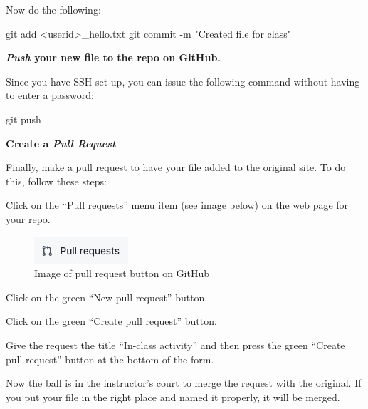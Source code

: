 \documentclass[
  letterpaper,
  DIV=11,
  numbers=noendperiod]{scrreport}
\newenvironment{Shaded}{\begin{snugshade}}{\end{snugshade}}
\newcommand{\AttributeTok}[1]{\textcolor[rgb]{0.40,0.45,0.13}{#1}}
\newcommand{\FunctionTok}[1]{\textcolor[rgb]{0.28,0.35,0.67}{#1}}
\newcommand{\NormalTok}[1]{\textcolor[rgb]{0.00,0.23,0.31}{#1}}
\newcommand{\OperatorTok}[1]{\textcolor[rgb]{0.37,0.37,0.37}{#1}}
\newcommand{\StringTok}[1]{\textcolor[rgb]{0.13,0.47,0.30}{#1}}
\begin{document}
Now do the following:

\begin{Shaded}
\begin{Highlighting}[]
\FunctionTok{git}\NormalTok{ add }\OperatorTok{\textless{}}\NormalTok{userid}\OperatorTok{\textgreater{}}\NormalTok{\_hello.txt}
\FunctionTok{git}\NormalTok{ commit }\AttributeTok{{-}m} \StringTok{"Created file for class"}
\end{Highlighting}
\end{Shaded}

\textbf{\emph{Push} your new file to the repo on GitHub.}

Since you have SSH set up, you can issue the following command without
having to enter a password:

\begin{Shaded}
\begin{Highlighting}[]
\FunctionTok{git}\NormalTok{ push}
\end{Highlighting}
\end{Shaded}

\textbf{Create a \emph{Pull Request}}

Finally, make a pull request to have your file added to the original
site. To do this, follow these steps:

Click on the ``Pull requests'' menu item (see image below) on the web
page for your repo.

\begin{figure}

{\centering \includegraphics{modules/../media/pull-request-button.jpg}

}

\caption{Image of pull request button on GitHub}

\end{figure}

Click on the green ``New pull request'' button.

Click on the green ``Create pull request'' button.

Give the request the title ``In-class activity'' and then press the
green ``Create pull request'' button at the bottom of the form.

Now the ball is in the instructor's court to merge the request with the
original. If you put your file in the right place and named it properly,
it will be merged.
\end{document}
